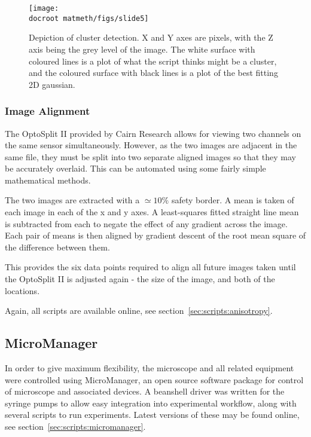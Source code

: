 \documentclass[../main.tex]{subfiles}
\begin{document}
\begin{figure}[h!]
\begin{center}
\texttt{[image: \\docroot matmeth/figs/slide5]}
\caption[Depiction of cluster detection]{Depiction of cluster detection. X and Y axes are pixels, with the Z axis being the grey level of the image. The white surface with coloured lines is a plot of what the script thinks might be a cluster, and the coloured surface with black lines is a plot of the best fitting 2D gaussian.}
\label{fig:imageprocessing:clusterdetection}
\end{center}
\end{figure}



\subsubsection{Image Alignment}

The OptoSplit II provided by Cairn Research allows for viewing two channels on the same sensor simultaneously. However, as the two images are adjacent in the same file, they must be split into two separate aligned images so that they may be accurately overlaid. This can be automated using some fairly simple mathematical methods.

The two images are extracted with a \(\simeq10\%\) safety border. A mean is taken of each image in each of the x and y axes. A least-squares fitted straight line mean is subtracted from each to negate the effect of any gradient across the image. Each pair of means is then aligned by gradient descent of the root mean square of the difference between them.

This provides the six data points required to align all future images taken until the OptoSplit II is adjusted again - the size of the image, and both of the locations.

Again, all scripts are available online, see section~\ref{sec:scripts:anisotropy}.

\subsection{MicroManager}

In order to give maximum flexibility, the microscope and all related equipment were controlled using MicroManager\cite{micromanager}, an open source software package for control of microscope and associated devices. A beanshell driver was written for the syringe pumps to allow easy integration into experimental workflow, along with several scripts to run experiments. Latest versions of these may be found online, see section~\ref{sec:scripts:micromanager}.
\end{document}

